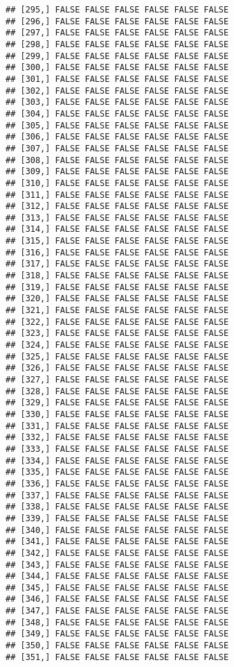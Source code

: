 \documentclass[
]{article}
\begin{document}
\begin{verbatim}
## [295,] FALSE FALSE FALSE FALSE FALSE FALSE
## [296,] FALSE FALSE FALSE FALSE FALSE FALSE
## [297,] FALSE FALSE FALSE FALSE FALSE FALSE
## [298,] FALSE FALSE FALSE FALSE FALSE FALSE
## [299,] FALSE FALSE FALSE FALSE FALSE FALSE
## [300,] FALSE FALSE FALSE FALSE FALSE FALSE
## [301,] FALSE FALSE FALSE FALSE FALSE FALSE
## [302,] FALSE FALSE FALSE FALSE FALSE FALSE
## [303,] FALSE FALSE FALSE FALSE FALSE FALSE
## [304,] FALSE FALSE FALSE FALSE FALSE FALSE
## [305,] FALSE FALSE FALSE FALSE FALSE FALSE
## [306,] FALSE FALSE FALSE FALSE FALSE FALSE
## [307,] FALSE FALSE FALSE FALSE FALSE FALSE
## [308,] FALSE FALSE FALSE FALSE FALSE FALSE
## [309,] FALSE FALSE FALSE FALSE FALSE FALSE
## [310,] FALSE FALSE FALSE FALSE FALSE FALSE
## [311,] FALSE FALSE FALSE FALSE FALSE FALSE
## [312,] FALSE FALSE FALSE FALSE FALSE FALSE
## [313,] FALSE FALSE FALSE FALSE FALSE FALSE
## [314,] FALSE FALSE FALSE FALSE FALSE FALSE
## [315,] FALSE FALSE FALSE FALSE FALSE FALSE
## [316,] FALSE FALSE FALSE FALSE FALSE FALSE
## [317,] FALSE FALSE FALSE FALSE FALSE FALSE
## [318,] FALSE FALSE FALSE FALSE FALSE FALSE
## [319,] FALSE FALSE FALSE FALSE FALSE FALSE
## [320,] FALSE FALSE FALSE FALSE FALSE FALSE
## [321,] FALSE FALSE FALSE FALSE FALSE FALSE
## [322,] FALSE FALSE FALSE FALSE FALSE FALSE
## [323,] FALSE FALSE FALSE FALSE FALSE FALSE
## [324,] FALSE FALSE FALSE FALSE FALSE FALSE
## [325,] FALSE FALSE FALSE FALSE FALSE FALSE
## [326,] FALSE FALSE FALSE FALSE FALSE FALSE
## [327,] FALSE FALSE FALSE FALSE FALSE FALSE
## [328,] FALSE FALSE FALSE FALSE FALSE FALSE
## [329,] FALSE FALSE FALSE FALSE FALSE FALSE
## [330,] FALSE FALSE FALSE FALSE FALSE FALSE
## [331,] FALSE FALSE FALSE FALSE FALSE FALSE
## [332,] FALSE FALSE FALSE FALSE FALSE FALSE
## [333,] FALSE FALSE FALSE FALSE FALSE FALSE
## [334,] FALSE FALSE FALSE FALSE FALSE FALSE
## [335,] FALSE FALSE FALSE FALSE FALSE FALSE
## [336,] FALSE FALSE FALSE FALSE FALSE FALSE
## [337,] FALSE FALSE FALSE FALSE FALSE FALSE
## [338,] FALSE FALSE FALSE FALSE FALSE FALSE
## [339,] FALSE FALSE FALSE FALSE FALSE FALSE
## [340,] FALSE FALSE FALSE FALSE FALSE FALSE
## [341,] FALSE FALSE FALSE FALSE FALSE FALSE
## [342,] FALSE FALSE FALSE FALSE FALSE FALSE
## [343,] FALSE FALSE FALSE FALSE FALSE FALSE
## [344,] FALSE FALSE FALSE FALSE FALSE FALSE
## [345,] FALSE FALSE FALSE FALSE FALSE FALSE
## [346,] FALSE FALSE FALSE FALSE FALSE FALSE
## [347,] FALSE FALSE FALSE FALSE FALSE FALSE
## [348,] FALSE FALSE FALSE FALSE FALSE FALSE
## [349,] FALSE FALSE FALSE FALSE FALSE FALSE
## [350,] FALSE FALSE FALSE FALSE FALSE FALSE
## [351,] FALSE FALSE FALSE FALSE FALSE FALSE

\end{verbatim}
\end{document}
